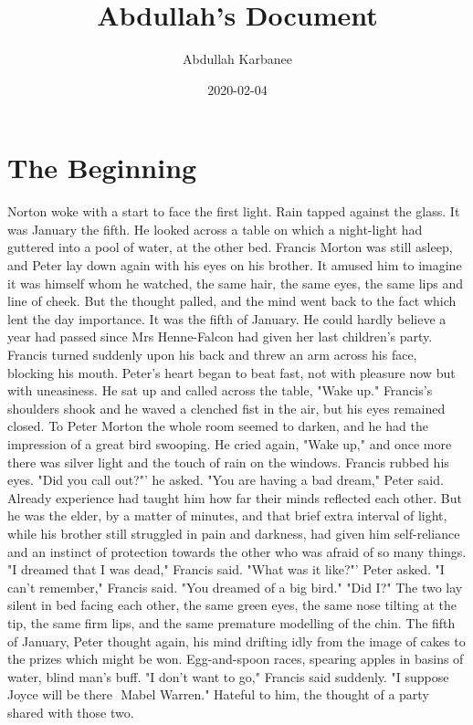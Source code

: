 \documentclass{report}
\title{\huge Abdullah's Document}
\date{2020-02-04}
\author{Abdullah Karbanee}
\begin{document}
	\maketitle
	\newpage
	\chapter{The Beginning}

Norton woke with a start to face the first light. Rain tapped against the glass.
It was January the fifth.
He looked across a table on which a night-light had guttered into a pool of
water, at the other bed. Francis Morton was still asleep, and Peter lay down
again with his eyes on his brother. It amused him to imagine it was himself whom
he watched, the same hair, the same eyes, the same lips and line of cheek. But
the thought palled, and the mind went back to the fact which lent the day
importance. It was the fifth of January. He could hardly believe a year had
passed since Mrs Henne-Falcon had given her last children's party.
Francis turned suddenly upon his back and threw an arm across his face, blocking
his mouth. Peter's heart began to beat fast, not with pleasure now but with
uneasiness. He sat up and called across the table, "Wake up." Francis's
shoulders shook and he waved a clenched fist in the air, but his eyes remained
closed. To Peter Morton the whole room seemed to darken, and he had the
impression of a great bird swooping. He cried again, "Wake up," and once more
there was silver light and the touch of rain on the windows.
Francis rubbed his eyes. "Did you call out?"' he asked.
"You are having a bad dream," Peter said. Already experience had taught him how
far their minds reflected each other. But he was the elder, by a matter of
minutes, and that brief extra interval of light, while his brother still
struggled in pain and darkness, had given him self-reliance and an instinct of
protection towards the other who was afraid of so many things.
"I dreamed that I was dead," Francis said.
"What was it like?"' Peter asked.
"I can't remember," Francis said.
"You dreamed of a big bird."
"Did I?"
The two lay silent in bed facing each other, the same green eyes, the same nose
tilting at the tip, the same firm lips, and the same premature modelling of the
chin. The fifth of January, Peter thought again, his mind drifting idly from the
image of cakes to the prizes which might be won. Egg-and-spoon races, spearing
apples in basins of water, blind man's buff.
"I don't want to go," Francis said suddenly. "I suppose Joyce will be there 
Mabel Warren." Hateful to him, the thought of a party shared with those two.
\end{document}
